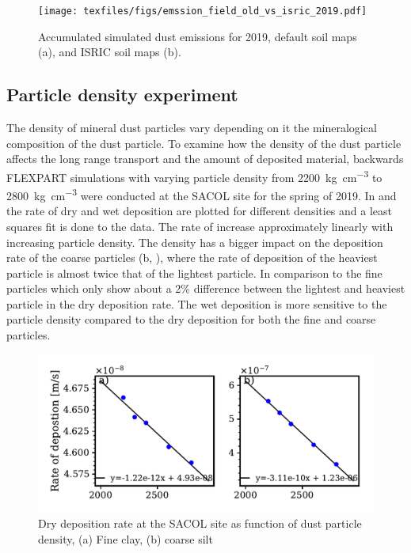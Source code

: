 \begin{figure}[htpb]
    \centering
    \texttt{[image: texfiles/figs/emssion\_field\_old\_vs\_isric\_2019.pdf]}
    \caption{Accumulated simulated dust emissions for 2019, default soil maps (a), and ISRIC soil maps (b).}
    \label{fig:emissions_ISRIC_old_com}
\end{figure}
\subsection{Particle density experiment}\label{sec:density_experiment}
The density of mineral dust particles vary depending on it the mineralogical composition of the dust particle. To examine how the density of the dust particle affects the long range transport and the amount of deposited material, backwards
FLEXPART simulations with varying particle density from \SI{2200}{\kg\per\cubic\cm} to \SI{2800}{\kg\per\cubic\cm}  were conducted  at the SACOL site for the spring of 2019. 
In  and  the rate of dry and wet deposition are plotted for different densities and a least squares fit is done to the data. The rate of  increase approximately linearly with increasing particle density. The density has a bigger impact on the deposition rate of the coarse particles (b, ), where the rate of deposition of the heaviest particle is almost twice that of the lightest particle. In comparison to the fine particles which only show about a 2\% difference between the lightest and heaviest particle in the dry deposition rate. The wet deposition is more sensitive to the particle density compared to the dry deposition for both the fine and coarse particles. 
\begin{figure}[hptb]
    \centering
    \includegraphics[width=\textwidth]{texfiles/figs/drydep_function_of_density.pdf}
    \caption{Dry deposition rate at the SACOL site as function of dust particle density, (a) Fine clay, (b) coarse silt}
    \label{fig:dry_dep_density}
\end{figure}

